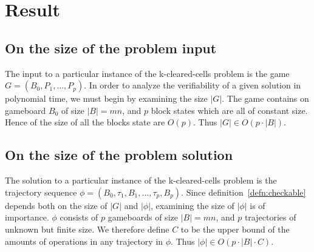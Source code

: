 \section{Result}

\subsection{On the size of the problem input}
The input to a particular instance of the k-cleared-cells problem is the game $G = (B_0, P_1, \ldots, P_p)$. In order to analyze the verifiability of a given solution in polynomial time, we must begin by examining the size $|G|$. The game contains on gameboard $B_0$ of size $|B| = mn$, and $p$ block states which are all of constant size. Hence of the size of all the blocks state are $O(p)$. Thus $|G| \in O(p \cdot |B|)$.

\subsection{On the size of the problem solution}
The solution to a particular instance of the k-cleared-cells problem is the trajectory sequence $\phi=(B_0, \tau_1, B_1, \ldots ,\tau_p, B_p)$. Since definition~\ref{defn:checkable} depends both on the size of $|G|$ and $|\phi|$, examining the size of $|\phi|$ is of importance. $\phi$ consists of $p$ gameboards of size $|B| = mn$, and $p$ trajectories of unknown but finite size. We therefore define $C$ to be the upper bound of the amounts of operations in any trajectory in $\phi$. Thus $|\phi| \in O(p \cdot |B| \cdot C)$.





